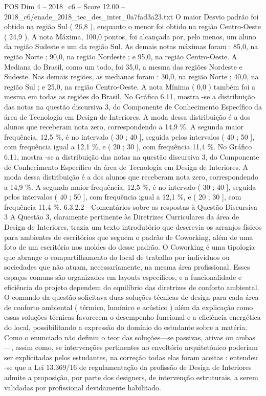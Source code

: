 \begin{textsample}{POS Dim 4 – 2018\_c6 – Score 12.00 – 2018\_c6/enade\_2018\_tec\_des\_inter\_0a7fad3a23.txt}
O maior Desvio padrão foi obtido na região Sul ( 26,8 ), enquanto o menor foi obtido na região Centro-Oeste ( 24,9 ).
A nota Máxima, 100,0 pontos, foi alcançada por, pelo menos, um aluno da região Sudeste e um da região Sul.
As demais notas máximas foram : 85,0, na região Norte ; 90,0, na região Nordeste ; e 95,0, na região Centro-Oeste.
A Mediana do Brasil, como um todo, foi 35,0, a mesma das regiões Nordeste e Sudeste.
Nas demais regiões, as medianas foram : 30,0, na região Norte ; 40,0, na região Sul ; e 25,0, na região Centro-Oeste.
A nota Mínima ( 0,0 ) também foi a mesma em todas as regiões do Brasil.
No Gráfico 6.11, mostra -se a distribuição das notas na questão discursiva 3, do Componente de Conhecimento Específico da área de Tecnologia em Design de Interiores.
A moda dessa distribuição é a dos alunos que receberam nota zero, correspondendo a 14,9 \%.
A segunda maior frequência, 12,5 \%, é no intervalo ( 30 ; 40 ], seguida pelos intervalos ( 40 ; 50 ], com frequência igual a 12,1 \%, e ( 20 ; 30 ], com frequência 11,4 \%.
No Gráfico 6.11, mostra -se a distribuição das notas na questão discursiva 3, do Componente de Conhecimento Específico da área de Tecnologia em Design de Interiores.
A moda dessa distribuição é a dos alunos que receberam nota zero, correspondendo a 14,9 \%.
A segunda maior frequência, 12,5 \%, é no intervalo ( 30 ; 40 ], seguida pelos intervalos ( 40 ; 50 ], com frequência igual a 12,1 \%, e ( 20 ; 30 ], com frequência 11,4 \%. 6.3.2.2 - Comentários sobre as respostas à Questão Discursiva 3 A Questão 3, claramente pertinente às Diretrizes Curriculares da área de Design de Interiores, trazia um texto introdutório que descrevia os arranjos físicos para ambientes de escritórios que seguem o padrão de Coworking, além de uma foto de um escritório nos moldes do desse padrão.
O Coworking é uma tipologia que abrange o compartilhamento do local de trabalho por indivíduos ou sociedades que não atuam, necessariamente, na mesma área profissional.
Esses espaços comuns são organizados em layouts específicos, e a funcionalidade e eficiência do projeto dependem do equilíbrio das diretrizes de conforto ambiental.
O comando da questão solicitava duas soluções técnicas de design para cada área de conforto ambiental ( térmico, lumínico e acústico ) além da explicação como essas soluções técnicas favorecem o desempenho funcional e a eficiência energética do local, possibilitando a expressão do domínio do estudante sobre a matéria.
Como o enunciado não definiu o teor das soluções—se passivas, ativas ou ambas —, assim como, se intervenções pertinentes ao envoltório arquitetônico poderiam ser explicitadas pelos estudantes, na correção todas elas foram aceitas : entendeu -se que a Lei 13.369/16 de regulamentação da profissão de Design de Interiores admite a proposição, por parte dos designers, de intervenção estruturais, a serem validadas por profissional devidamente habilitado.

\end{textsample}
